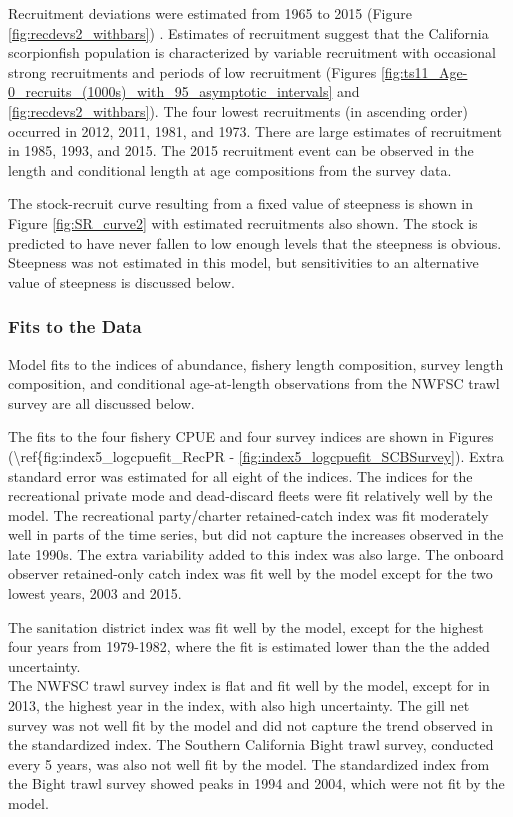 \documentclass[12pt,]{article}
\begin{document}
Recruitment deviations were estimated from 1965 to 2015 (Figure
\ref{fig:recdevs2_withbars}) . Estimates of recruitment suggest that the
California scorpionfish population is characterized by variable
recruitment with occasional strong recruitments and periods of low
recruitment (Figures
\ref{fig:ts11_Age-0_recruits_(1000s)_with_95_asymptotic_intervals} and
\ref{fig:recdevs2_withbars}). The four lowest recruitments (in ascending
order) occurred in 2012, 2011, 1981, and 1973. There are large estimates
of recruitment in 1985, 1993, and 2015. The 2015 recruitment event can
be observed in the length and conditional length at age compositions
from the survey data.

The stock-recruit curve resulting from a fixed value of steepness is
shown in Figure \ref{fig:SR_curve2} with estimated recruitments also
shown. The stock is predicted to have never fallen to low enough levels
that the steepness is obvious. Steepness was not estimated in this
model, but sensitivities to an alternative value of steepness is
discussed below.

\subsubsection{Fits to the Data}\label{fits-to-the-data}

Model fits to the indices of abundance, fishery length composition,
survey length composition, and conditional age-at-length observations
from the NWFSC trawl survey are all discussed below.

The fits to the four fishery CPUE and four survey indices are shown in
Figures (\textbackslash{}ref\{fig:index5\_logcpuefit\_RecPR -
\ref{fig:index5_logcpuefit_SCBSurvey}). Extra standard error was
estimated for all eight of the indices. The indices for the recreational
private mode and dead-discard fleets were fit relatively well by the
model. The recreational party/charter retained-catch index was fit
moderately well in parts of the time series, but did not capture the
increases observed in the late 1990s. The extra variability added to
this index was also large. The onboard observer retained-only catch
index was fit well by the model except for the two lowest years, 2003
and 2015.

The sanitation district index was fit well by the model, except for the
highest four years from 1979-1982, where the fit is estimated lower than
the the added uncertainty.\\
The NWFSC trawl survey index is flat and fit well by the model, except
for in 2013, the highest year in the index, with also high uncertainty.
The gill net survey was not well fit by the model and did not capture
the trend observed in the standardized index. The Southern California
Bight trawl survey, conducted every 5 years, was also not well fit by
the model. The standardized index from the Bight trawl survey showed
peaks in 1994 and 2004, which were not fit by the model.
\end{document}
